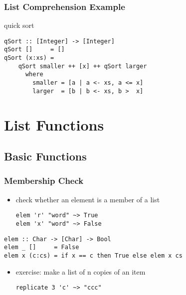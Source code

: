 \documentclass[dvipsnames]{beamer}
\theoremstyle{plain}
\begin{document}
\begin{frame}[fragile]
  \frametitle{List Comprehension Example}

  \begin{exampleblock}{quick sort}
    \begin{lstlisting}
qSort :: [Integer] -> [Integer]
qSort []     = []
qSort (x:xs) =
    qSort smaller ++ [x] ++ qSort larger
      where
        smaller = [a | a <- xs, a <= x]
        larger  = [b | b <- xs, b >  x]
    \end{lstlisting}
  \end{exampleblock}
\end{frame}

\section{List Functions}

\subsection{Basic Functions}

\begin{frame}[fragile]
  \frametitle{Membership Check}

  \begin{itemize}
    \item check whether an element is a member of a list
    \begin{lstlisting}[frame=none]
elem 'r' "word" ~> True
elem 'x' "word" ~> False
    \end{lstlisting}
  \end{itemize}

  \pause
  \begin{exampleblock}{}
    \begin{lstlisting}[deletekeywords={elem}]
elem :: Char -> [Char] -> Bool
elem _ []     = False
elem x (c:cs) = if x == c then True else elem x cs
    \end{lstlisting}
  \end{exampleblock}

  \pause
  \begin{itemize}
    \item exercise: make a list of n copies of an item
    \begin{lstlisting}[frame=none]
replicate 3 'c' ~> "ccc"
    \end{lstlisting}
  \end{itemize}
\end{frame}
\end{document}
